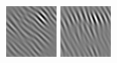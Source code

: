 \begin{figure}
\begin{center}
  \includegraphics[width=\columnwidth/9]{ch4/figures/imag_1_6.jpg}
  \includegraphics[width=\columnwidth/9]{ch4/figures/imag_1_7.jpg}\\

\end{center}
\end{figure}
